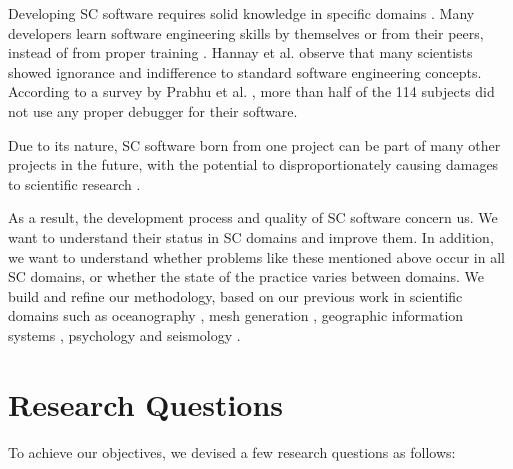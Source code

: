 Developing SC software requires solid knowledge in specific domains \cite{Wilson2014}. Many developers learn software engineering skills by themselves or from their peers, instead of from proper training \cite{Hannay2009}. Hannay et al. \cite{Hannay2009} observe that many scientists showed ignorance and indifference to standard software engineering concepts. According to a survey by Prabhu et al. \cite{Prabhu2011}, more than half of the 114 subjects did not use any proper debugger for their software.

Due to its nature, SC software born from one project can be part of many other projects in the future, with the potential to disproportionately causing damages to scientific research \cite{Wilson2014}. 

As a result, the development process and quality of SC software concern us. We want to understand their status in SC domains and improve them. In addition, we want to understand whether problems like these mentioned above occur in all SC domains, or whether the state of the practice varies between domains. We build and refine our methodology, based on our previous work in scientific domains such as oceanography \cite{Smith2015}, mesh generation \cite{smith2016state}, geographic information systems \cite{smith2018state}, psychology \cite{smith2018statistical} and seismology \cite{Smith2018Seismology}. 

\section{Research Questions}
\label{sec_research_questions}
To achieve our objectives, we devised a few research questions as follows:

